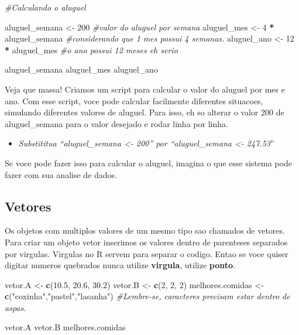 \documentclass[
]{book}
\newenvironment{Shaded}{\begin{snugshade}}{\end{snugshade}}
\newcommand{\CommentTok}[1]{\textcolor[rgb]{0.56,0.35,0.01}{\textit{#1}}}
\newcommand{\DecValTok}[1]{\textcolor[rgb]{0.00,0.00,0.81}{#1}}
\newcommand{\FloatTok}[1]{\textcolor[rgb]{0.00,0.00,0.81}{#1}}
\newcommand{\FunctionTok}[1]{\textcolor[rgb]{0.13,0.29,0.53}{\textbf{#1}}}
\newcommand{\NormalTok}[1]{#1}
\newcommand{\OtherTok}[1]{\textcolor[rgb]{0.56,0.35,0.01}{#1}}
\newcommand{\SpecialCharTok}[1]{\textcolor[rgb]{0.81,0.36,0.00}{\textbf{#1}}}
\newcommand{\StringTok}[1]{\textcolor[rgb]{0.31,0.60,0.02}{#1}}
\providecommand{\tightlist}{%
  \setlength{\itemsep}{0pt}\setlength{\parskip}{0pt}}
\begin{document}
\begin{Shaded}
\begin{Highlighting}[]
\CommentTok{\#Calculando o aluguel}

\NormalTok{aluguel\_semana }\OtherTok{\textless{}{-}} \DecValTok{200}              \CommentTok{\#valor do aluguel por semana}
\NormalTok{aluguel\_mes }\OtherTok{\textless{}{-}} \DecValTok{4} \SpecialCharTok{*}\NormalTok{ aluguel\_semana  }\CommentTok{\#considerando que 1 mes possui 4 semanas.}
\NormalTok{aluguel\_ano }\OtherTok{\textless{}{-}} \DecValTok{12} \SpecialCharTok{*}\NormalTok{ aluguel\_mes    }\CommentTok{\#o ano possui 12 meses eh serio}

\NormalTok{aluguel\_semana}
\NormalTok{aluguel\_mes}
\NormalTok{aluguel\_ano}
\end{Highlighting}
\end{Shaded}

Veja que massa! Criamos um script para calcular o valor do aluguel por mes e ano. Com esse script, voce pode calcular facilmente diferentes situacoes, simulando diferentes valores de aluguel. Para isso, eh so alterar o valor 200 de aluguel\_semana para o valor desejado e rodar linha por linha.

\begin{itemize}
\tightlist
\item
  \emph{Substititua ``aluguel\_semana \textless- 200'' por ``aluguel\_semana \textless- 247.53}''
\end{itemize}

Se voce pode fazer isso para calcular o aluguel, imagina o que esse sistema pode fazer com sua analise de dados.

\hypertarget{vetores}{%
\subsection{Vetores}\label{vetores}}

Os objetos com multiplos valores de um mesmo tipo sao chamados de vetores. Para criar um objeto vetor inserimos os valores dentro de parenteses separados por virgulas. Virgulas no R servem para separar o codigo. Entao se voce quiser digitar numeros quebrados nunca utilize \textbf{virgula}, utilize \textbf{ponto}.

\begin{Shaded}
\begin{Highlighting}[]
\NormalTok{vetor.A }\OtherTok{\textless{}{-}} \FunctionTok{c}\NormalTok{(}\FloatTok{10.5}\NormalTok{, }\FloatTok{20.6}\NormalTok{, }\FloatTok{30.2}\NormalTok{)}
\NormalTok{vetor.B }\OtherTok{\textless{}{-}} \FunctionTok{c}\NormalTok{(}\DecValTok{2}\NormalTok{, }\DecValTok{2}\NormalTok{, }\DecValTok{2}\NormalTok{)}
\NormalTok{melhores.comidas }\OtherTok{\textless{}{-}} \FunctionTok{c}\NormalTok{(}\StringTok{"coxinha"}\NormalTok{,}\StringTok{"pastel"}\NormalTok{,}\StringTok{"lasanha"}\NormalTok{) }\CommentTok{\#Lembre{-}se, caracteres precisam estar dentro de aspas.}

\NormalTok{vetor.A}
\NormalTok{vetor.B}
\NormalTok{melhores.comidas}
\end{Highlighting}
\end{Shaded}
\end{document}

